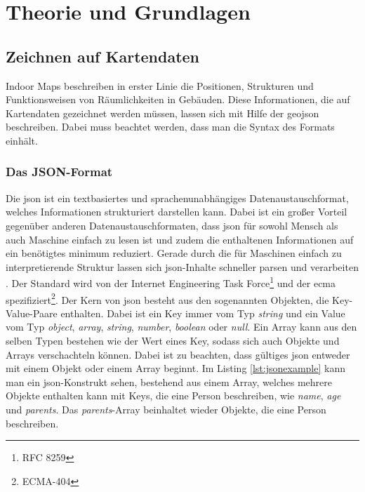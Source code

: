 \chapter{Theorie und Grundlagen}

\section{Zeichnen auf Kartendaten}
Indoor Maps beschreiben in erster Linie die Positionen, Strukturen und Funktionsweisen von Räumlichkeiten in Gebäuden. Diese Informationen, die auf Kartendaten gezeichnet werden müssen, lassen sich mit Hilfe der \ac{geojson} beschreiben. Dabei muss beachtet werden, dass man die Syntax des Formats einhält.

\subsection{Das JSON-Format}
Die \ac{json} ist ein textbasiertes und sprachenunabhängiges Datenaustauschformat, welches Informationen strukturiert darstellen kann. Dabei ist ein großer Vorteil gegenüber anderen Datenaustauschformaten, dass \ac{json} für sowohl Mensch als auch Maschine einfach zu lesen ist und zudem die enthaltenen Informationen auf ein benötigtes minimum reduziert. Gerade durch die für Maschinen einfach zu interpretierende Struktur lassen sich \ac{json}-Inhalte schneller parsen und verarbeiten \parencite{WYS2014}. Der Standard wird von der Internet Engineering Task Force\footnote{RFC 8259} und der \ac{ecma} spezifiziert\footnote{ECMA-404}.\pbreak%
%
Der Kern von \ac{json} besteht aus den sogenannten Objekten, die Key-Value-Paare enthalten. Dabei ist ein Key immer vom Typ \textit{string} und ein Value vom Typ \textit{object}, \textit{array}, \textit{string}, \textit{number}, \textit{boolean} oder \textit{null}. Ein Array kann aus den selben Typen bestehen wie der Wert eines Key, sodass sich auch Objekte und Arrays verschachteln können. Dabei ist zu beachten, dass gültiges \ac{json} entweder mit einem Objekt oder einem Array beginnt. Im Listing \ref{lst:jsonexample} kann man ein \ac{json}-Konstrukt sehen, bestehend aus einem Array, welches mehrere Objekte enthalten kann mit Keys, die eine Person beschreiben, wie \textit{name}, \textit{age} und \textit{parents}.%
Das \textit{parents}-Array beinhaltet wieder Objekte, die eine Person beschreiben.
%
%
